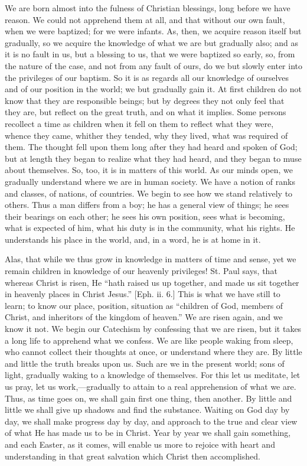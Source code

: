 We are born almost into the fulness of Christian blessings, long
before we have reason. We could not apprehend them at all, and that
without our own fault, when we were baptized; for we were infants. As,
then, we acquire reason itself but gradually, so we acquire the
knowledge of what we are but gradually also; and as it is no fault in
us, but a blessing to us, that we were baptized so early, so, from the
nature of the case, and not from any fault of ours, do we but slowly
enter into the privileges of our baptism. So it is as regards all our
knowledge of ourselves and of our position in the world; we but
gradually gain it. At first children do not know that they are
responsible beings; but by degrees they not only feel that they are, but
reflect on the great truth, and on what it implies. Some persons
recollect a time as children when it fell on them to reflect what they
were, whence they came, whither they tended, why they lived, what was
required of them. The thought fell upon them long after they had heard
and spoken of God; but at length they began to realize what they had
heard, and they began to muse about themselves. So, too, it is in
matters of this world. As our minds open, we gradually understand where
we are in human society. We have a notion of ranks and classes, of
nations, of countries. We begin to see how we stand relatively to
others. Thus a man differs from a boy; he has a general view of things;
he sees their bearings on each other; he sees his own position, sees
what is becoming, what is expected of him, what his duty is in the
community, what his rights. He understands his place in the world, and,
in a word, he is at home in it.

Alas, that while we thus grow in knowledge in matters of time and
sense, yet we remain children in knowledge of our heavenly privileges!
St. Paul says, that whereas Christ is risen, He ``hath raised us up
together, and made us sit together in heavenly places in Christ
Jesus.'' [Eph. ii. 6.] This is what we have still to learn; to know
our place, position, situation as ``children of God, members of
Christ, and inheritors of the kingdom of heaven.'' We are risen
again, and we know it not. We begin our Catechism by confessing that we
are risen, but it takes a long life to apprehend what we confess. We are
like people waking from sleep, who cannot collect their thoughts at
once, or understand where they are. By little and little the truth
breaks upon us. Such are we in the present world; sons of light,
gradually waking to a knowledge of themselves. For this let us meditate,
let us pray, let us work,—gradually to attain to a real apprehension
of what we are. Thus, as time goes on, we shall gain first one thing,
then another. By little and little we shall give up shadows and find the
substance. Waiting on God day by day, we shall make progress day by day,
and approach to the true and clear view of what He has made us to be in
Christ. Year by year we shall gain something, and each Easter, as it
comes, will enable us more to rejoice with heart and understanding in
that great salvation which Christ then accomplished.

